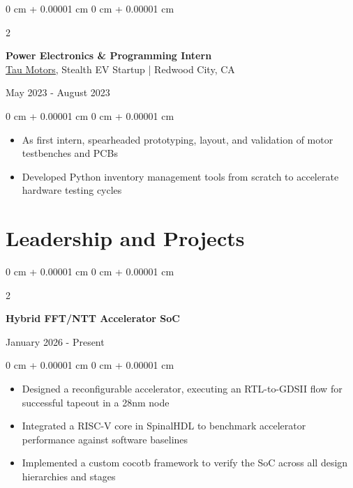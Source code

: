 \documentclass[10pt, letterpaper]{article}
\newlength{\betweenEntriesSpace}
\newlength{\entryToBulletsSpace}
\newlength{\bulletsTopSep}
\newlength{\bulletsParsep}
\newenvironment{highlights}{
    \begin{itemize}[
        label=-,
        topsep=\bulletsTopSep,
        parsep=\bulletsParsep,
        partopsep=0pt,
        itemsep=0pt,
        leftmargin=0 cm + 10pt
    ]
}{
    \end{itemize}
} %
\newenvironment{onecolentry}{
    \begin{adjustwidth}{
        0 cm + 0.00001 cm
    }{
        0 cm + 0.00001 cm
    }
}{
    \end{adjustwidth}
} %
\newenvironment{twocolentry}[2][]{
    \onecolentry
    \def\secondColumn{#2}
    \setcolumnwidth{\fill, 4.5 cm}
    \begin{paracol}{2}
}{
    \switchcolumn \raggedleft \secondColumn
    \end{paracol}
    \endonecolentry
} %
\begin{document}
        \vspace{\betweenEntriesSpace} %

        \begin{twocolentry}
            {May 2023 - August 2023}
            {\textbf{Power Electronics \& Programming Intern} \\
            \href{https://www.taumotors.com/}{\underline{Tau Motors}}, Stealth EV Startup | Redwood City, CA}
        \end{twocolentry}
        \vspace{\entryToBulletsSpace}
        \begin{onecolentry}
            \begin{highlights}

                \item As first intern, spearheaded prototyping, layout, and validation of motor testbenches and PCBs
                \item Developed Python inventory management tools from scratch to accelerate hardware testing cycles

            \end{highlights}
        \end{onecolentry}
    

    \section{Leadership and Projects}


        \begin{twocolentry}
            {January 2026 - Present}
            {\textbf{Hybrid FFT/NTT Accelerator SoC} \\}
        \end{twocolentry}
        \vspace{\entryToBulletsSpace}
        \begin{onecolentry}
            \begin{highlights}

                \item Designed a reconfigurable accelerator, executing an RTL-to-GDSII flow for successful tapeout in a 28nm node
                \item Integrated a RISC-V core in SpinalHDL to benchmark accelerator performance against software baselines
                \item Implemented a custom cocotb framework to verify the SoC across all design hierarchies and stages

            \end{highlights}
        \end{onecolentry}
\end{document}
